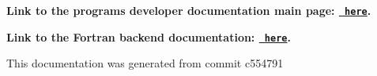 \label{index_md_repo_PYTHON_MAINPAGE}%
%
 {\bfseries{Link to the program\textquotesingle{}s developer documentation main page\+: \href{https://joegilkes.github.io/PX915-Docs/}{\texttt{ here}}.}}

{\bfseries{Link to the Fortran backend documentation\+: \href{https://joegilkes.github.io/PX915-Docs/fortran/docs/index.html}{\texttt{ here}}.}}

This documentation was generated from commit c554791 